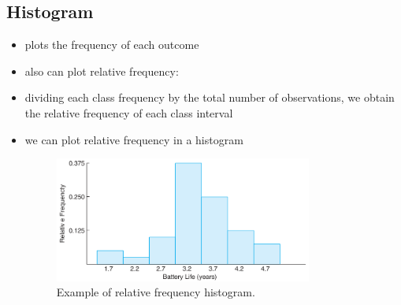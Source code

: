 \documentclass[10pt]{article}
\begin{document}
\subsection{Histogram}
\begin{itemize}
    \item plots the frequency of each outcome
    \item also can plot relative frequency:
    \item dividing each class frequency by the total number of observations, we obtain the relative frequency of each class interval
    \item we can plot relative frequency in a histogram
        \begin{figure}[H]
            \centering
            \includegraphics[width=0.8\textwidth]{histogram}
            \caption{Example of relative frequency histogram.}
            \label{fig:histogram}
        \end{figure}
\end{itemize}
\end{document}
